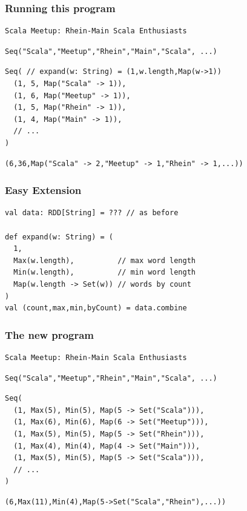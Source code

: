 \documentclass{beamer}
\begin{document}
\begin{frame}[fragile]
  \frametitle{Running this program}
\begin{verbatim}
Scala Meetup: Rhein-Main Scala Enthusiasts
\end{verbatim}
\begin{verbatim}
Seq("Scala","Meetup","Rhein","Main","Scala", ...)
\end{verbatim}
\begin{verbatim}
Seq( // expand(w: String) = (1,w.length,Map(w->1))
  (1, 5, Map("Scala" -> 1)),
  (1, 6, Map("Meetup" -> 1)),
  (1, 5, Map("Rhein" -> 1)),
  (1, 4, Map("Main" -> 1)),
  // ...
)
\end{verbatim}
\begin{verbatim}
(6,36,Map("Scala" -> 2,"Meetup" -> 1,"Rhein" -> 1,...))
\end{verbatim}
\end{frame}

\begin{frame}[fragile]
  \frametitle{Easy Extension}
\begin{verbatim}
val data: RDD[String] = ??? // as before

def expand(w: String) = (
  1,
  Max(w.length),          // max word length
  Min(w.length),          // min word length
  Map(w.length -> Set(w)) // words by count
)
val (count,max,min,byCount) = data.combine
\end{verbatim}
\end{frame}

\begin{frame}[fragile]
  \frametitle{The new program}
\begin{verbatim}
Scala Meetup: Rhein-Main Scala Enthusiasts
\end{verbatim}
\begin{verbatim}
Seq("Scala","Meetup","Rhein","Main","Scala", ...)
\end{verbatim}
\begin{verbatim}
Seq(
  (1, Max(5), Min(5), Map(5 -> Set("Scala"))),
  (1, Max(6), Min(6), Map(6 -> Set("Meetup"))),
  (1, Max(5), Min(5), Map(5 -> Set("Rhein"))),
  (1, Max(4), Min(4), Map(4 -> Set("Main"))),
  (1, Max(5), Min(5), Map(5 -> Set("Scala"))),
  // ...
)
\end{verbatim}
\begin{verbatim}
(6,Max(11),Min(4),Map(5->Set("Scala","Rhein"),...))
\end{verbatim}
\end{frame}
\end{document}
